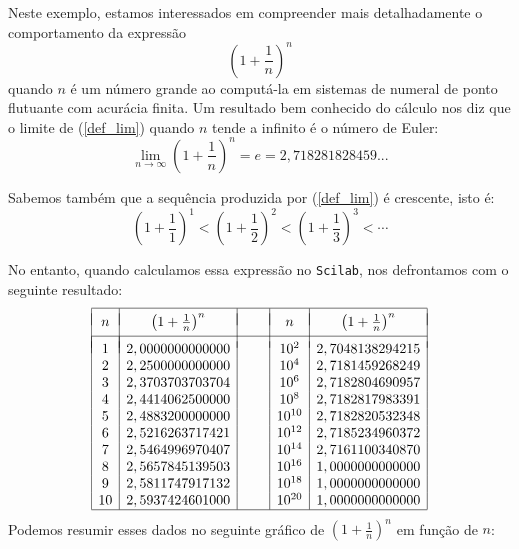 \documentclass[main.tex]{subfiles}
\begin{document}
\begin{ex} Neste exemplo, estamos interessados em compreender mais detalhadamente o comportamento da expressão
\begin{equation}\label{def_lim}\left(1+\frac{1}{n}\right)^n\end{equation}
quando $n$ é um número grande ao computá-la em sistemas de numeral de ponto flutuante com acurácia finita.
Um resultado bem conhecido do cálculo nos diz que o limite de (\ref{def_lim}) quando $n$ tende a infinito é o número de Euler:
\begin{equation}\label{lim}\lim_{n\to \infty}\left(1+\frac{1}{n}\right)^n=e= 2,718281828459...\end{equation}

Sabemos também que a sequência produzida por (\ref{def_lim}) é crescente, isto é:
$$\left(1+\frac{1}{1}\right)^1< \left(1+\frac{1}{2}\right)^2< \left(1+\frac{1}{3}\right)^3 < \cdots $$

No entanto, quando calculamos essa expressão no \verb+Scilab+, nos defrontamos com o seguinte resultado:
$$\begin{array}{|c|c|c|c|c|}
\hline &&&&\\[-0.3cm]
n & \left(1+\frac{1}{n}\right)^n&~~~~&n & \left(1+\frac{1}{n}\right)^n\\
 &&&&\\[-0.3cm]
\hline\\[-0.3cm]
1 & 2,0000000000000 && 10^{2} & 2,7048138294215 \\
2 & 2,2500000000000 && 10^{4} & 2,7181459268249 \\
3 & 2,3703703703704 && 10^{6} & 2,7182804690957 \\
4 & 2,4414062500000 && 10^{8} & 2,7182817983391 \\
5 & 2,4883200000000 && 10^{10} & 2,7182820532348 \\
6 & 2,5216263717421 && 10^{12} & 2,7185234960372 \\
7 & 2,5464996970407 && 10^{14} & 2,7161100340870 \\
8 & 2,5657845139503 && 10^{16} & 1,0000000000000 \\
9 & 2,5811747917132 && 10^{18} & 1,0000000000000 \\
10 & 2,5937424601000 && 10^{20} & 1,0000000000000 \\
\hline
\end{array}
$$
Podemos resumir esses dados no seguinte gráfico de $\left(1+\frac{1}{n}\right)^n$ em função de $n$:


\end{ex}
\end{document}

